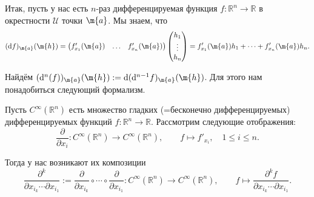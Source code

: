 Итак, пусть у нас есть $n$-раз дифференцируемая функция $f:\mathbb{R}^n \to \mathbb{R}$ в окрестности $\mathscr{U}$ точки $\m{a}$. Мы знаем, что
\[
 (\mathrm{d}f)_\m{a}(\m{h}) = \begin{pmatrix}
     f'_{x_1}(\m{a}) & \ldots & f'_{x_n}(\m{a})
 \end{pmatrix} \begin{pmatrix}
      h_1 \\ \vdots \\ h_n
 \end{pmatrix} = f_{x_1}'(\m{a})h_1 + \cdots + f_{x_n}'(\m{a})h_n.
\]

Найдём $(\mathrm{d}^n(f))_\m{a}(\m{h}): = \mathrm{d}(\mathrm{d}^{n-1}f)_\m{a}(\m{h})$. Для этого нам понадобиться следующий формализм.

Пусть $C^\infty(\mathbb{R}^n)$ есть множество гладких (=бесконечно дифференцируемых) дифференцируемых функций $f:\mathbb{R}^n \to \mathbb{R}$. Рассмотрим следующие отображения:
\[
 \frac{\partial}{\partial x_i}: C^\infty(\mathbb{R}^n) \to C^\infty(\mathbb{R}^n), \qquad f\mapsto f'_{x_i}, \quad 1 \le i \le n.
\]

Тогда у нас возникают их композиции 
\[
 \frac{\partial^k}{\partial x_{i_k} \cdots \partial x_{i_1}}:=\dfrac{\partial}{\partial x_{i_k}} \circ \cdots \circ \dfrac{\partial}{\partial x_{i_1}}:  C^\infty(\mathbb{R}^n) \to C^\infty(\mathbb{R}^n), \qquad f \mapsto \frac{\partial^k f}{\partial x_{i_k} \cdots \partial x_{i_1}}.
\]




